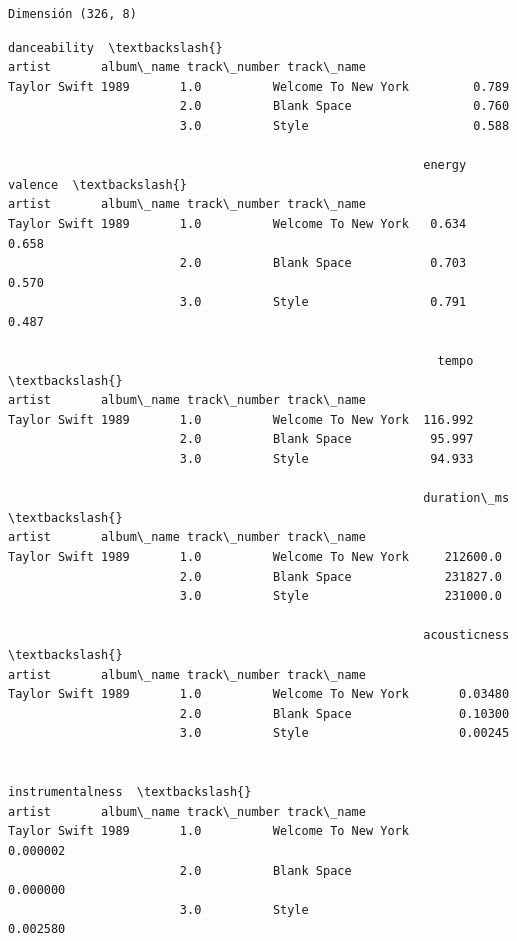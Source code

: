 \documentclass[11pt]{article}
\begin{document}
    \begin{Verbatim}[commandchars=\\\{\}]
Dimensión (326, 8)

    \end{Verbatim}

    
    \begin{Verbatim}[commandchars=\\\{\}]
                                                          danceability  \textbackslash{}
artist       album\_name track\_number track\_name                          
Taylor Swift 1989       1.0          Welcome To New York         0.789   
                        2.0          Blank Space                 0.760   
                        3.0          Style                       0.588   

                                                          energy  valence  \textbackslash{}
artist       album\_name track\_number track\_name                             
Taylor Swift 1989       1.0          Welcome To New York   0.634    0.658   
                        2.0          Blank Space           0.703    0.570   
                        3.0          Style                 0.791    0.487   

                                                            tempo  \textbackslash{}
artist       album\_name track\_number track\_name                     
Taylor Swift 1989       1.0          Welcome To New York  116.992   
                        2.0          Blank Space           95.997   
                        3.0          Style                 94.933   

                                                          duration\_ms  \textbackslash{}
artist       album\_name track\_number track\_name                         
Taylor Swift 1989       1.0          Welcome To New York     212600.0   
                        2.0          Blank Space             231827.0   
                        3.0          Style                   231000.0   

                                                          acousticness  \textbackslash{}
artist       album\_name track\_number track\_name                          
Taylor Swift 1989       1.0          Welcome To New York       0.03480   
                        2.0          Blank Space               0.10300   
                        3.0          Style                     0.00245   

                                                          instrumentalness  \textbackslash{}
artist       album\_name track\_number track\_name                              
Taylor Swift 1989       1.0          Welcome To New York          0.000002   
                        2.0          Blank Space                  0.000000   
                        3.0          Style                        0.002580   


\end{Verbatim}
\end{document}
